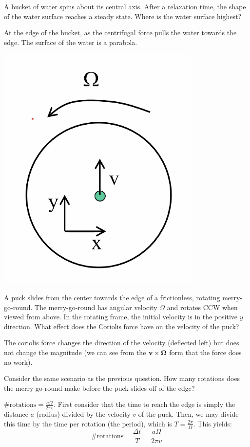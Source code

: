 \documentclass[../PHYS306Notes.tex]{subfiles}
\begin{document}
A bucket of water spins about its central axis. After a relaxation time, the shape of the water surface reaches a steady state. Where is the water surface highest?
\begin{s}
At the edge of the bucket, as the centrifugal force pulls the water towards the edge. The surface of the water is a parabola.
\end{s}
\begin{center}
    \includegraphics[scale=0.5]{Lecture-16/l16-img1.png}
\end{center}
A puck slides from the center towards the edge of a frictionless, rotating merry-go-round. The merry-go-round has angular velocity $\Omega$ and rotates CCW when viewed from above. In the rotating frame, the initial velocity is in the positive $y$ direction. What effect does the Coriolis force have on the velocity of the puck?
\begin{s}
The coriolis force changes the direction of the velocity (deflected left) but does not change the magnitude (we can see from the $\mathbf{v} \times \mathbf{\Omega}$ form that the force does no work).
\end{s}

Consider the same scenario as the previous question. How many rotations does the merry-go-round make before the puck slides off of the edge?

\begin{s}
$\# \text{rotations} = \frac{a\Omega}{2\pi v}$. First consider that the time to reach the edge is simply the distance $a$ (radius) divided by the velocity $v$ of the puck. Then, we may divide this time by the time per rotation (the period), which is $T = \frac{2\pi}{\Omega}$. This yields:
\[\# \text{rotations} = \frac{\Delta t}{T} = \frac{a\Omega}{2\pi v}\]
\end{s}
\end{document}
